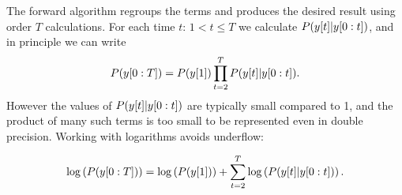The forward algorithm regroups the terms and produces the desired
result using order $T$ calculations.  For each time $t:\, 1 < t \leq
T$ we calculate $P({y}{[t]}|y[0:t])$, and in principle we can
write
\begin{equation*}
  P(y[0:T]) = P({y}{[1]}) \prod_{t=2}^T P({y}{[t]}|y[0:t]).
\end{equation*}
However the values of $P({y}{[t]}|y[0:t])$ are typically
small compared to 1, and the product of many such terms is too small
to be represented even in double precision.  Working with logarithms
avoids underflow:

\begin{equation}
  \mlabel{eq:logP}
  \log\left( P(\ts{y}{0}{T}) \right) = \log\left( P(\ti{y}{1})
 \right) + \sum_{t=2}^T \log\left( P(\ti{y}{t}|\ts{y}{0}{t})\right).
\end{equation}

\newcommand{\alphax}[2]{%
  \colorbox{yellow}{%
    $P_{S(#1)|\ts{Y}{0}{#1}}\left(#2 |\ts{y}{0}{#1} \right)$%
  }%
}%
\newcommand{\prealpha}{%
  \colorbox{green}{%
    $P_{\ti{S}{t}|\ts{Y}{0}{t}} \left(s | \ts{y}{0}{t} \right)$%
  }%
}%
\newcommand{\gammax}{%
  \colorbox{cyan}{%
    $P(\ti{y}{t}|\ts{y}{0}{t})$%
  }%
}%
\newcommand{\pregamma}{%
  \colorbox{pink}{%
    $P_{\ti{S}{t},\ti{Y}{t}|\ts{Y}{0}{t}} \left(s,\ti{y}{t}|\ts{y}{0}{t}\right)$%
  }%
}%

